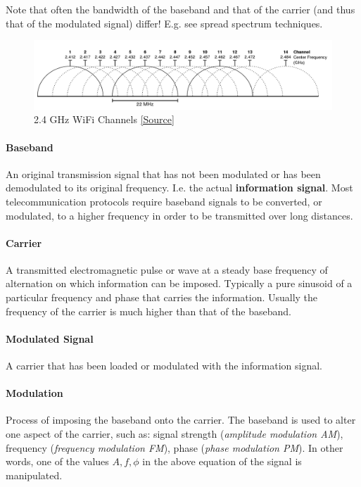 Note that often the bandwidth of the baseband and that of the carrier (and thus that of the modulated signal) differ!
E.g. see spread spectrum techniques.

\begin{figure}
	\centering
	\includegraphics[scale=0.35]{images/1-wifi-channels.png}
	\caption{2.4 GHz WiFi Channels \href{https://en.wikipedia.org/wiki/List\_of\_WLAN\_channels\#/media/File:2.4\_GHz\_Wi-Fi\_channels\_(802.11b,g_WLAN).svg}{[Source]}}
	\label{fig:wifi-channels}
\end{figure}

\paragraph{Baseband}
An original transmission signal that has not been modulated or has been demodulated to its original frequency.
I.e. the actual \textbf{information signal}.
Most telecommunication protocols require baseband signals to be converted, or modulated, to a higher frequency in order to be transmitted over long distances.

\paragraph{Carrier}
A transmitted electromagnetic pulse or wave at a steady base frequency of alternation on which information can be imposed.
Typically a pure sinusoid of a particular frequency and phase that carries the information.
Usually the frequency of the carrier is much higher than that of the baseband.

\paragraph{Modulated Signal}
A carrier that has been loaded or modulated with the information signal.

\paragraph{Modulation}
Process of imposing the baseband onto the carrier.
The baseband is used to alter one aspect of the carrier, such as:
signal strength (\textit{amplitude modulation AM}), frequency (\textit{frequency modulation FM}), phase (\textit{phase modulation PM}).
In other words, one of the values $A, f, \phi$ in the above equation of the signal is manipulated.


